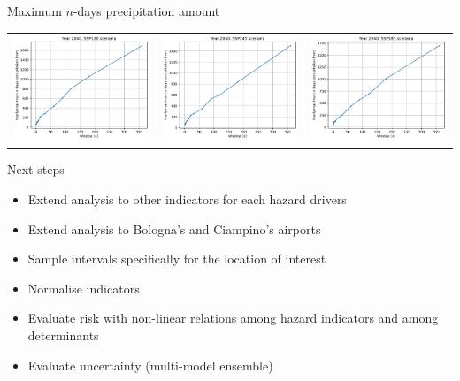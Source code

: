\documentclass[aspectratio=169]{beamer}
\begin{document}
\begin{frame}{Maximum $n$-days precipitation amount}
  \begin{center}
    \begin{tabular}{ccc}
      \includegraphics[width=0.3\columnwidth]{max_n_day_precipitation_amount_ssp126} & \includegraphics[width=0.3\columnwidth]{max_n_day_precipitation_amount_ssp245} & \includegraphics[width=0.3\columnwidth]{max_n_day_precipitation_amount_ssp585}
    \end{tabular}
  \end{center}
\end{frame}



\begin{frame}{Next steps}
  \begin{itemize}
    \item Extend analysis to other indicators for each hazard drivers
    \item Extend analysis to Bologna's and Ciampino's airports
    \item Sample intervals specifically for the location of interest
    \item Normalise indicators
    \item Evaluate risk with non-linear relations among hazard indicators and among determinants
    \item Evaluate uncertainty (multi-model ensemble)
  \end{itemize}
\end{frame}
\end{document}
